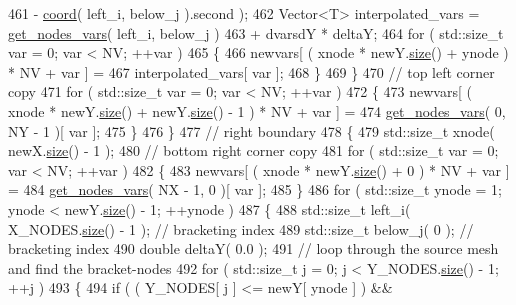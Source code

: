 \begin{DoxyCode}
461                               - \hyperlink{classLuna_1_1Mesh2D_add4d12155922731ccf59fe4454699eed}{coord}( left\_i, below\_j ).second );
462         Vector<T> interpolated\_vars =   \hyperlink{classLuna_1_1Mesh2D_ae91c7515960ecedf43e4ed3f411080a1}{get\_nodes\_vars}( left\_i, below\_j )
463                                       + dvarsdY * deltaY;
464         \textcolor{keywordflow}{for} ( std::size\_t var = 0; var < NV; ++var )
465         \{
466           newvars[ ( xnode * newY.\hyperlink{classLuna_1_1Vector_ac9b6ed7a0df401728f27c193fbc8f4d8}{size}() + ynode ) * NV + var ] =
467                                                        interpolated\_vars[ var ];
468         \}
469       \}
470       \textcolor{comment}{// top left corner copy}
471       \textcolor{keywordflow}{for} ( std::size\_t var = 0; var < NV; ++var )
472       \{
473         newvars[ ( xnode * newY.\hyperlink{classLuna_1_1Vector_ac9b6ed7a0df401728f27c193fbc8f4d8}{size}() + newY.\hyperlink{classLuna_1_1Vector_ac9b6ed7a0df401728f27c193fbc8f4d8}{size}() - 1 ) * NV + var ] =
474         \hyperlink{classLuna_1_1Mesh2D_ae91c7515960ecedf43e4ed3f411080a1}{get\_nodes\_vars}( 0, NY - 1 )[ var ];
475       \}
476     \}
477     \textcolor{comment}{// right boundary}
478     \{
479       std::size\_t xnode( newX.\hyperlink{classLuna_1_1Vector_ac9b6ed7a0df401728f27c193fbc8f4d8}{size}() - 1 );
480       \textcolor{comment}{// bottom right corner copy}
481       \textcolor{keywordflow}{for} ( std::size\_t var = 0; var < NV; ++var )
482       \{
483         newvars[ ( xnode * newY.\hyperlink{classLuna_1_1Vector_ac9b6ed7a0df401728f27c193fbc8f4d8}{size}() + 0 ) * NV + var ] =
484         \hyperlink{classLuna_1_1Mesh2D_ae91c7515960ecedf43e4ed3f411080a1}{get\_nodes\_vars}( NX - 1, 0 )[ var ];
485       \}
486       \textcolor{keywordflow}{for} ( std::size\_t ynode = 1; ynode < newY.\hyperlink{classLuna_1_1Vector_ac9b6ed7a0df401728f27c193fbc8f4d8}{size}() - 1; ++ynode )
487       \{
488         std::size\_t left\_i( X\_NODES.\hyperlink{classLuna_1_1Vector_ac9b6ed7a0df401728f27c193fbc8f4d8}{size}() - 1 );  \textcolor{comment}{// bracketing index}
489         std::size\_t below\_j( 0 ); \textcolor{comment}{// bracketing index}
490         \textcolor{keywordtype}{double} deltaY( 0.0 );
491         \textcolor{comment}{// loop through the source mesh and find the bracket-nodes}
492         \textcolor{keywordflow}{for} ( std::size\_t j = 0; j < Y\_NODES.\hyperlink{classLuna_1_1Vector_ac9b6ed7a0df401728f27c193fbc8f4d8}{size}() - 1; ++j )
493         \{
494           \textcolor{keywordflow}{if} ( ( Y\_NODES[ j ] <= newY[ ynode ] ) &&

\end{DoxyCode}
